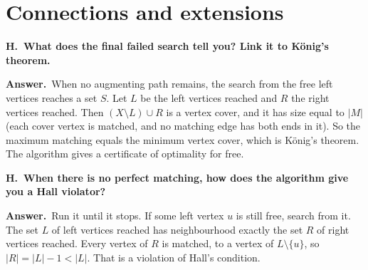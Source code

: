 \documentclass[11pt]{article}
\newcommand{\Qhead}[2]{%
  \vspace{0.9em}\par\noindent
  {\large\bfseries #1\ #2}\par\nopagebreak\vspace{-0.2em}}
\newcommand{\HQ}[1]{\refstepcounter{qh}\Qhead{H\theqh.}{#1}}
\newcommand{\A}{\par\noindent\textbf{Answer.}\ }
\begin{document}
\section{Connections and extensions}

\HQ{What does the final failed search tell you? Link it to K\"onig's theorem.}
\A When no augmenting path remains, the search from the free left vertices reaches
a set $S$. Let $L$ be the left vertices reached and $R$ the right vertices
reached. Then $(X\setminus L)\cup R$ is a vertex cover, and it has size equal to
$|M|$ (each cover vertex is matched, and no matching edge has both ends in it).
So the maximum matching equals the minimum vertex cover, which is K\"onig's
theorem. The algorithm gives a certificate of optimality for free.


\begin{center}
\end{center}
\HQ{When there is no perfect matching, how does the algorithm give you a Hall violator?}
\A Run it until it stops. If some left vertex $u$ is still free, search from it. The
set $L$ of left vertices reached has neighbourhood exactly the set $R$ of right
vertices reached. Every vertex of $R$ is matched, to a vertex of $L\setminus\{u\}$,
so $|R|=|L|-1<|L|$. That is a violation of Hall's condition.
\end{document}
